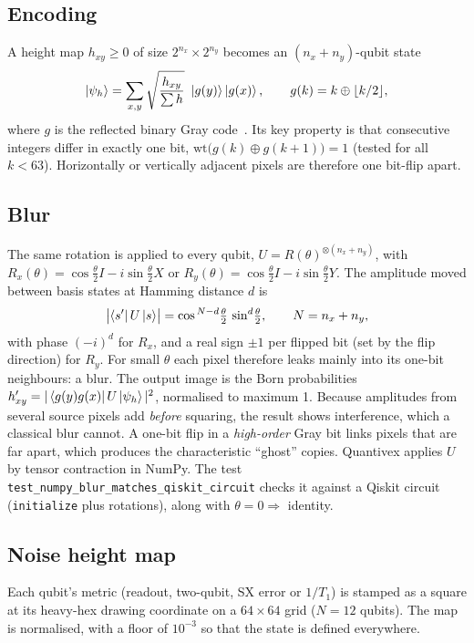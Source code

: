 \documentclass[10pt,a4paper]{article}
\newcommand{\code}[1]{\texttt{\small #1}}
\begin{document}
\subsection{Encoding}
A height map $h_{xy}\ge0$ of size $2^{n_x}\times2^{n_y}$ becomes an $(n_x+n_y)$-qubit state
\begin{equation}
\ket{\psi_h}=\sum_{x,y}\sqrt{\frac{h_{xy}}{\sum h}}\ \ket{g(y)}\ket{g(x)},\qquad g(k)=k\oplus\lfloor k/2\rfloor ,
\end{equation}
where $g$ is the reflected binary Gray code~\cite{Gray1953}. Its key property is that consecutive integers differ in exactly one bit, $\mathrm{wt}\bigl(g(k)\oplus g(k+1)\bigr)=1$ (tested for all $k<63$). Horizontally or vertically adjacent pixels are therefore one bit-flip apart.

\subsection{Blur}
The same rotation is applied to every qubit, $U=R(\theta)^{\otimes(n_x+n_y)}$, with $R_x(\theta)=\cos\frac\theta2 I-i\sin\frac\theta2 X$ or $R_y(\theta)=\cos\frac\theta2 I-i\sin\frac\theta2 Y$. The amplitude moved between basis states at Hamming distance $d$ is
\begin{equation}
\bigl|\bra{s'}U\ket{s}\bigr|=\cos^{\,N-d}\!\tfrac\theta2\,\sin^{d}\!\tfrac\theta2,\qquad N=n_x+n_y ,
\end{equation}
with phase $(-i)^d$ for $R_x$, and a real sign $\pm1$ per flipped bit (set by the flip direction) for $R_y$. For small $\theta$ each pixel therefore leaks mainly into its one-bit neighbours: a blur. The output image is the Born probabilities $h'_{xy}=|\bra{g(y)g(x)}U\ket{\psi_h}|^2$, normalised to maximum 1. Because amplitudes from several source pixels add \emph{before} squaring, the result shows interference, which a classical blur cannot. A one-bit flip in a \emph{high-order} Gray bit links pixels that are far apart, which produces the characteristic ``ghost'' copies. Quantivex applies $U$ by tensor contraction in NumPy. The test \code{test\_numpy\_blur\_matches\_qiskit\_circuit} checks it against a Qiskit circuit (\code{initialize} plus rotations), along with $\theta=0\Rightarrow$ identity.

\subsection{Noise height map}
Each qubit's metric (readout, two-qubit, SX error or $1/T_1$) is stamped as a square at its heavy-hex drawing coordinate on a $64\times64$ grid ($N=12$ qubits). The map is normalised, with a floor of $10^{-3}$ so that the state is defined everywhere.
\end{document}
